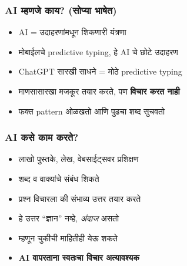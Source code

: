 \begin{frame}[fragile]\frametitle{AI म्हणजे काय? (सोप्या भाषेत)}

\begin{itemize}
\item AI = उदाहरणांमधून शिकणारी यंत्रणा
\item मोबाईलचे predictive typing, हे AI चे छोटे उदाहरण
\item ChatGPT सारखी साधने = मोठे predictive typing
\item माणसासारखा मजकूर तयार करते, पण \textbf{विचार करत नाही}
\item फक्त pattern ओळखतो आणि पुढचा शब्द सुचवतो
\end{itemize}

\end{frame}

\begin{frame}[fragile]\frametitle{AI कसे काम करते?}

\begin{itemize}
\item लाखो पुस्तके, लेख, वेबसाईट्सवर प्रशिक्षण
\item शब्द व वाक्यांचे संबंध शिकते
\item प्रश्न विचारला की संभाव्य उत्तर तयार करते
\item हे उत्तर ``ज्ञान'' नव्हे, \textit{अंदाज} असतो
\item म्हणून चुकीची माहितीही येऊ शकते
\item \textbf{AI वापरताना स्वतःचा विचार अत्यावश्यक}
\end{itemize}

\end{frame}

